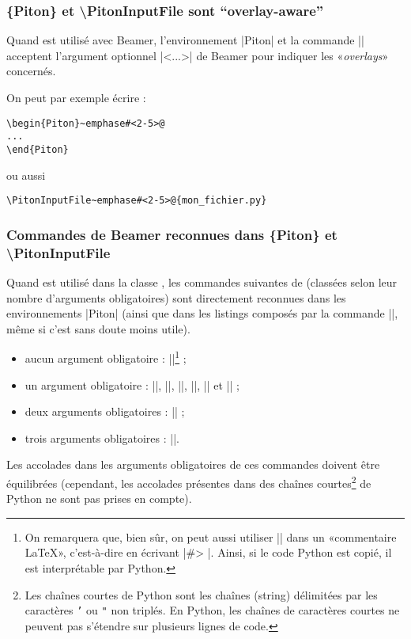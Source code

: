 \documentclass[dvipsnames,svgnames]{article}
\begin{document}
\subsubsection{\{Piton\} et \textbackslash PitonInputFile sont ``overlay-aware''}

Quand  est utilisé avec Beamer, l'environnement |{Piton}| et la commande |\PitonInputFile| acceptent
l'argument optionnel |<...>| de Beamer pour indiquer les «\emph{overlays}» concernés.

On peut par exemple écrire :

\begin{Verbatim}
\begin{Piton}~emphase#<2-5>@
...
\end{Piton}
\end{Verbatim}

ou aussi 

\begin{Verbatim}
\PitonInputFile~emphase#<2-5>@{mon_fichier.py}
\end{Verbatim}


\subsubsection{Commandes de Beamer reconnues dans \{Piton\} et \textbackslash PitonInputFile}

Quand  est utilisé dans la classe , les commandes suivantes de  (classées selon
leur nombre d'arguments obligatoires) sont directement reconnues dans les environnements |{Piton}| (ainsi que dans
les listings composés par la commande |\PitonInputFile|, même si c'est sans doute moins utile).
%
\begin{itemize}
\item aucun argument obligatoire : |\pause|\footnote{On remarquera que, bien sûr, on peut aussi utiliser |\pause|
  dans un «commentaire LaTeX», c'est-à-dire en écrivant |#> \pause|. Ainsi, si le code Python est copié, il est
  interprétable par Python.} ;
\item un argument obligatoire : |\action|, |\alert|, |\invisible|, |\only|, |\uncover| et |\visible| ;
\item deux arguments obligatoires : |\alt| ; 
\item trois arguments obligatoires : |\temporal|.
\end{itemize}

\medskip
Les accolades dans les arguments obligatoires de ces commandes doivent être équilibrées (cependant, les accolades
présentes dans des chaînes courtes\footnote{Les chaînes courtes de Python sont les chaînes (string) délimitées par
  les caractères \texttt{'} ou \texttt{"} non triplés. En Python, les chaînes de caractères courtes ne peuvent pas
  s'étendre sur plusieurs lignes de code.} de Python ne sont pas prises en compte).
\end{document}
